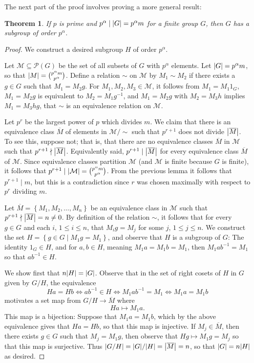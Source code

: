 \documentclass[11pt]{article}
\newcommand{\cbr}[1]{\left\{#1\right\}}
\newtheorem*{theorem}{Theorem}
\begin{document}
The next part of the proof involves proving a more general result: \begin{theorem}
    If $p$ is prime and $p^\alpha \mid \abs{G} = p^\alpha m$ for a finite group $G$, then $G$ has a subgroup of order $p^\alpha$.
\end{theorem}
\begin{proof}
    We construct a desired subgroup $H$ of order $p^\alpha$.

    Let $\mathcal{M}\subseteq \mathcal{P}(G)$ be the set of all subsets of $G$ with $p^\alpha$ elements. Let $\abs{G} = p^\alpha m$, so that $\abs{M} = \binom{p^\alpha m}{p^\alpha}$. Define a relation $\sim$ on $\mathcal{M}$ by $M_1\sim M_2$ if there exists a $g\in G$ such that $M_1 = M_2g$. For $M_1,M_2,M_3\in \mathcal{M}$, it follows from $M_1 =  M_1 1_G$, $M_1 = M_2g$ is equivalent to $M_2 = M_1g^{-1}$, and $M_1 = M_2g$ with $M_2 = M_3h$ implies $M_1 = M_3hg$, that $\sim$ is an equivalence relation on $\mathcal{M}$.
    
    Let $p^r$ be the largest power of $p$ which divides $m$. We claim that there is an equivalence class $\overline{M}$ of elements in $\mathcal{M}/\sim$ such that $p^{r+1}$ does not divide $\abs{\overline{M}}$. To see this, suppose not; that is, that there are no equivalence classes $\overline{M}$ in $\mathcal{M}$ such that $p^{r+1}\nmid\abs{\overline{M}}$. Equivalently said, $p^{r+1}\mid \abs{\overline{M}}$ for every equivalence class $\overline{M}$ of $\mathcal{M}$. Since equivalence classes partition $\mathcal{M}$ (and $\mathcal{M}$ is finite because $G$ is finite), it follows that $p^{r+1}\mid \abs{\mathcal{M}} = \binom{p^\alpha m}{p^\alpha}$. From the previous lemma it follows that $p^{r+1}\mid m$, but this is a contradiction since $r$ was chosen maximally with respect to $p^r$ dividing $m$.

    Let $\overline{M} = \cbr{M_1,M_2,\dots,M_n}$ be an equivalence class in $\mathcal{M}$ such that $p^{r+1}\nmid \abs{\overline{M}}= n\neq 0$. By definition of the relation $\sim$, it follows that for every $g\in G$ and each $i$, $1\leq i \leq n$, that $M_ig = M_j$ for some $j$, $1\leq j \leq n$. We construct the set $H = \cbr{g\in G \mid M_1g = M_1}$, and observe that $H$ is a subgroup of $G$: The identity $1_G\in H$, and for $a,b\in H$, meaning $M_1a = M_1b = M_1$, then $M_1ab^{-1} = M_1$ so that $ab^{-1}\in H$.

    We show first that $n\abs{H} = \abs{G}$. Observe that in the set of right cosets of $H$ in $G$ given by $G/H$, the equivalence \[Ha = Hb \iff ab^{-1}\in H\iff M_1ab^{-1} = M_1\iff M_1a = M_1b\] motivates a set map from $G/H\to \overline{M}$ where \[Ha\mapsto M_1a.\] This map is a bijection: Suppose that $M_1a = M_1b$, which by the above equivalence gives that $Ha = Hb$, so that this map is injective. If $M_j\in \overline{M}$, then there exists $g\in G$ such that $M_j = M_1g$, then observe that $Hg\mapsto M_1g = M_j$ so that this map is surjective. Thus $\abs{G/H} = \abs{G}/\abs{H} = \abs{\overline{M}} = n$, so that $\abs{G} = n\abs{H}$ as desired.


\end{proof}
\end{document}
